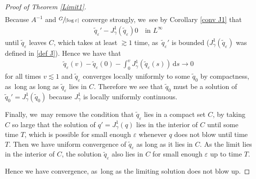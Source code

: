 \documentclass[10pt]{amsart}
\let\epsilon\varepsilon
\theoremstyle{definition}
\newcommand\dd{\,\mathrm{d}}
\newcommand\ds{\dd s}
\let\eps\epsilon
\begin{document}
\begin{proof}[Proof of Theorem \ref{Limit1}]
\begin{align*}
\end{align*}
Because $A^{-1}$ and $\sfrac{G}{|{\log\eps}|}$ converge strongly, we~see by Corollary \ref{conv J1} that
\begin{align*}
\tilde{q}_\eps'- J_\gamma^1(\tilde{q}_\eps)0 \quad\text{in $L^\infty$}
\end{align*}
until $\tilde{q}_\eps$ leaves $C$, which takes at least $\gtrsim 1$ time, as~$\tilde{q}_\eps'$ is bounded ($J_\gamma^1(\tilde{q}_\eps)$ was defined in \ref{def J}).
Hence we have that
\begin{align*}
\tilde{q}_\eps(v)-\tilde{q}_\eps(0)-\int_0^v J_\gamma^1(\tilde{q}_\eps(s))\ds\to 0
\end{align*}
for all times $v\lesssim 1$ and $\tilde{q}_\eps$ converges locally uniformly to some $\tilde{q}_0$ by compactness, as~long as long as $\tilde{q}_\eps$ lies in $C$. Therefore we see that $\tilde{q}_0$ must be a solution of $\tilde{q}_0'=J_\gamma^1(\tilde{q}_0)$ because $J_\gamma^1$ is locally uniformly continuous.

Finally, we~may remove the condition that $\tilde{q}_\eps$ lies in a compact set $C$, by taking~$C$ so large that the solution of $q'=J_\gamma^1(q)$ lies in the interior of $C$ until some time $T$, which is possible for small enough $\eps$ whenever $q$ does not blow until time $T$. Then we have uniform convergence of $\tilde{q}_\eps$ as long as it lies in $C$. As the limit lies in the interior of $C$, the solution $\tilde{q}_\eps$ also lies in $C$ for small enough $\eps$ up to time $T$.

Hence we have convergence, as~long as the limiting solution does not blow up.
\end{proof}
\end{document}
